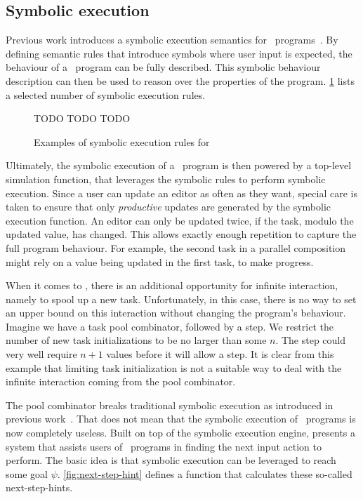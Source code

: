 
\subsection{Symbolic execution}

Previous work introduces a symbolic execution semantics for \TOPHAT\ programs~\cite{conf/ifl/NausSK19}.
By defining semantic rules that introduce symbols where user input is expected, the behaviour of a \TOP\ program can be fully described.
This symbolic behaviour description can then be used to reason over the properties of the program.
\cref{fig:symbolic-semantics} lists a selected number of symbolic execution rules.

\begin{figure}[h]
    TODO TODO TODO
    \caption{Examples of symbolic execution rules for \TOPHAT}
    \label{fig:symbolic-semantics}
\end{figure}

Ultimately, the symbolic execution of a \TOPHAT\ program is then powered by a top-level simulation function, that leverages the symbolic rules to perform symbolic execution.
Since a user can update an editor as often as they want, special care is taken to ensure that only \textit{productive} updates are generated by the symbolic execution function.
An editor can only be updated twice, if the task, modulo the updated value, has changed.
This allows exactly enough repetition to capture the full program behaviour.
For example, the second task in a parallel composition might rely on a value being updated in the first task, to make progress.

When it comes to \DYNTOPHAT, there is an additional opportunity for infinite interaction, namely to spool up a new task.
Unfortunately, in this case, there is no way to set an upper bound on this interaction without changing the program's behaviour.
Imagine we have a task pool combinator, followed by a step.
We restrict the number of new task initializations to be no larger than some $n$.
The step could very well require $n+1$ values before it will allow a step.
It is clear from this example that limiting task initialization is not a suitable way to deal with the infinite interaction coming from the pool combinator.

The pool combinator breaks traditional symbolic execution as introduced in previous work~\cite{conf/ifl/NausSK19}.
That does not mean that the symbolic execution of \DYNTOPHAT\ programs is now completely useless.
Built on top of the symbolic execution engine, \citet{conf/sfp/NausS20} presents a system that assists users of \TOPHAT\ programs in finding the next input action to perform.
The basic idea is that symbolic execution can be leveraged to reach some goal $\psi$.
\cref{fig:next-step-hint} defines a function that calculates these so-called next-step-hints.

